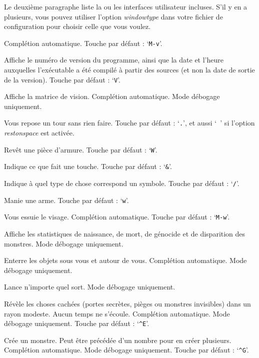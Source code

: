 \documentclass[titlepage]{article}
\begin{document}
\begin{description}[font=\mdseries\ttfamily]
Le deuxième paragraphe liste la ou les interfaces utilisateur incluses.
S'il y en a plusieurs, vous pouvez utiliser l'option \textit{windowtype}
dans votre fichier de configuration pour choisir celle que vous voulez.

Complétion automatique. Touche par défaut : `\texttt{M-v}'.
\item[\#versionshort]
Affiche le numéro de version du programme, ainsi que la date et l'heure auxquelles
l'exécutable a été compilé à partir des sources (et non la date de sortie de la version).
Touche par défaut : `\texttt{V}'.
\item[\#vision]
Affiche la matrice de vision.
Complétion automatique.
Mode débogage uniquement.
\item[\#wait]
Vous repose un tour sans rien faire.
Touche par défaut : `\texttt{.}', et aussi `{\tt{ }}' si l'option
\textit{rest\textunderscore on\textunderscore space} est activée.
\item[\#wear]
Revêt une pièce d'armure. Touche par défaut : `\texttt{W}'.
\item[\#whatdoes]
Indique ce que fait une touche. Touche par défaut : `\texttt{\&}'.
\item[\#whatis]
Indique à quel type de chose correspond un symbole. Touche par défaut : `\texttt{/}'.
\item[\#wield]
Manie une arme. Touche par défaut : `\texttt{w}'.
\item[\#wipe]
Vous essuie le visage. Complétion automatique. Touche par défaut : `\texttt{M-w}'.
\item[\#wizborn]
Affiche les statistiques de naissance, de mort, de génocide et de disparition des monstres.
Mode débogage uniquement.
\item[\#wizbury]
Enterre les objets sous vous et autour de vous.
Complétion automatique.
Mode débogage uniquement.
\item[\#wizcast]
Lance n'importe quel sort.
Mode débogage uniquement.
\item[\#wizdetect]
Révèle les choses cachées (portes secrètes, pièges ou monstres invisibles)
dans un rayon modeste.
Aucun temps ne s'écoule.
Complétion automatique.
Mode débogage uniquement.
Touche par défaut : `\texttt{\textasciicircum E}'.
\item[\#wizgenesis]
Crée un monstre.
Peut être précédée d'un nombre pour en créer plusieurs.
Complétion automatique.
Mode débogage uniquement.
Touche par défaut : `\texttt{\textasciicircum G}'.

\end{description}
\end{document}
